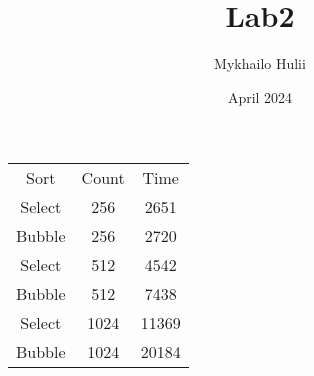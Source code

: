 \documentclass{article}
\title{Lab2}
\author{Mykhailo Hulii}
\date{April 2024}
\begin{document}
\maketitle

\begin{center}
\begin{tabular}{ c c c }
 Sort & Count & Time \\ 
 Select & 256 & 2651 \\  
 Bubble & 256 & 2720 \\
 Select & 512 & 4542 \\  
 Bubble & 512 & 7438 \\
 Select & 1024 & 11369 \\  
 Bubble & 1024 & 20184 \\
 
\end{tabular}
\end{center}
\end{document}
